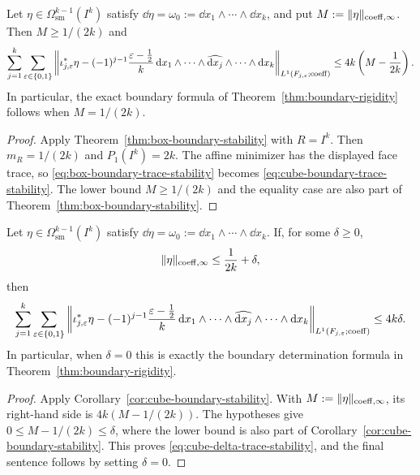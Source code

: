 \begin{corollary}
\label{cor:cube-boundary-stability}
Let $\eta\in\Omega^{k-1}_{\mathrm{sm}}(I^k)$ satisfy
$\dd\eta=\omega_0:=\dd x_1\wedge\cdots\wedge\dd x_k$, and put
$M:=\lVert \eta \rVert_{\mathrm{coeff},\infty}$. Then $M\ge 1/(2k)$ and
\begin{equation}
\label{eq:cube-boundary-trace-stability}
\sum_{j=1}^k\sum_{\varepsilon\in\{0,1\}}
\left\|
\iota_{j,\varepsilon}^\ast\eta
-
(-1)^{j-1}\frac{\varepsilon-\frac12}{k}\,
\mathrm{d} x_1\wedge\cdots\wedge\widehat{\mathrm{d} x_j}\wedge\cdots\wedge\mathrm{d} x_k
\right\|_{L^1(F_{j,\varepsilon};\mathrm{coeff})}
\le
4k\left(M-\frac{1}{2k}\right).
\end{equation}
In particular, the exact boundary formula of
Theorem~\ref{thm:boundary-rigidity} follows when $M=1/(2k)$.
\end{corollary}

\begin{proof}
Apply Theorem~\ref{thm:box-boundary-stability} with $R=I^k$. Then
$m_R=1/(2k)$ and $P_1(I^k)=2k$. The affine minimizer has the displayed face
trace, so \eqref{eq:box-boundary-trace-stability} becomes
\eqref{eq:cube-boundary-trace-stability}. The lower bound $M\ge1/(2k)$ and the
equality case are also part of Theorem~\ref{thm:box-boundary-stability}.
\end{proof}

\begin{corollary}
\label{cor:cube-delta-trace-stability}
Let $\eta\in\Omega^{k-1}_{\mathrm{sm}}(I^k)$ satisfy
$\dd\eta=\omega_0:=\dd x_1\wedge\cdots\wedge\dd x_k$. If, for some
$\delta\ge0$,
\[
\lVert \eta \rVert_{\mathrm{coeff},\infty}\le \frac{1}{2k}+\delta,
\]
then
\begin{equation}
\label{eq:cube-delta-trace-stability}
\sum_{j=1}^k\sum_{\varepsilon\in\{0,1\}}
\left\|
\iota_{j,\varepsilon}^\ast\eta
-
(-1)^{j-1}\frac{\varepsilon-\frac12}{k}\,
\mathrm{d} x_1\wedge\cdots\wedge\widehat{\mathrm{d} x_j}\wedge\cdots\wedge\mathrm{d} x_k
\right\|_{L^1(F_{j,\varepsilon};\mathrm{coeff})}
\le
4k\delta .
\end{equation}
In particular, when $\delta=0$ this is exactly the boundary determination
formula in Theorem~\ref{thm:boundary-rigidity}.
\end{corollary}

\begin{proof}
Apply Corollary~\ref{cor:cube-boundary-stability}. With
$M:=\lVert \eta \rVert_{\mathrm{coeff},\infty}$, its right-hand side is
$4k(M-1/(2k))$. The hypotheses give $0\le M-1/(2k)\le\delta$, where the lower
bound is also part of Corollary~\ref{cor:cube-boundary-stability}. This proves
\eqref{eq:cube-delta-trace-stability}, and the final sentence follows by
setting $\delta=0$.
\end{proof}

